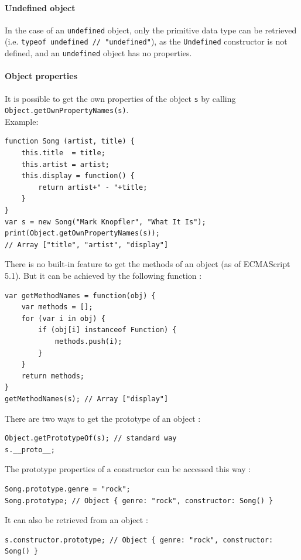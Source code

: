 \documentclass[a4paper,10pt]{article}
\begin{document}
\paragraph{Undefined object}{
In the case of an \lstinline|undefined| object, only the primitive data type can be retrieved (i.e. \lstinline|typeof undefined // "undefined"|), as the \lstinline|Undefined| constructor is not defined, and an \lstinline|undefined| object has no properties.
}


\paragraph{Object properties}{
It is possible to get the own properties of the object \lstinline|s| by calling \lstinline|Object.getOwnPropertyNames(s)|. \\
Example:
\begin{lstlisting}
function Song (artist, title) {
    this.title  = title;
    this.artist = artist;
    this.display = function() {
        return artist+" - "+title;
    }
}
var s = new Song("Mark Knopfler", "What It Is");
print(Object.getOwnPropertyNames(s));
// Array ["title", "artist", "display"]
\end{lstlisting}
}


There is no built-in feature to get the methods of an object (as of ECMAScript 5.1). But it can be achieved by the following function :
\begin{lstlisting}
var getMethodNames = function(obj) {
    var methods = [];
    for (var i in obj) {
        if (obj[i] instanceof Function) {
            methods.push(i);
        }
    }
    return methods;
}
getMethodNames(s); // Array ["display"]
\end{lstlisting}


There are two ways to get the prototype of an object :
\begin{lstlisting}
Object.getPrototypeOf(s); // standard way
s.__proto__;
\end{lstlisting}


The prototype properties of a constructor can be accessed this way :
\begin{lstlisting}
Song.prototype.genre = "rock";
Song.prototype; // Object { genre: "rock", constructor: Song() }
\end{lstlisting}

It can also be retrieved from an object :
\begin{lstlisting}
s.constructor.prototype; // Object { genre: "rock", constructor: Song() }
\end{lstlisting}
\end{document}
